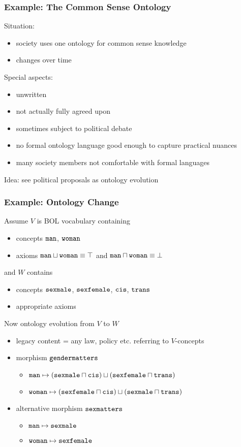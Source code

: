 \begin{frame}\frametitle{Example: The Common Sense Ontology}
Situation:
\begin{itemize}
\item society uses one ontology for common sense knowledge
\item changes over time
\end{itemize}

Special aspects:
\begin{itemize}
\item unwritten
\item not actually fully agreed upon
\item sometimes subject to political debate
\item no formal ontology language good enough to capture practical nuances
\item many society members not comfortable with formal languages
\end{itemize}


Idea: see political proposals as ontology evolution
\end{frame}

\begin{frame}[fragile]\frametitle{Example: Ontology Change}
Assume $V$ is BOL vocabulary containing
\begin{itemize}
\item concepts $\cn{man}$, $\cn{woman}$
\item axioms $\cn{man}\sqcup\cn{woman}\equiv \top$ and $\cn{man}\sqcap\cn{woman}\equiv \bot$
\end{itemize}

and $W$ contains
\begin{itemize}
\item concepts $\cn{sexmale}$, $\cn{sexfemale}$, $\cn{cis}$, $\cn{trans}$
\item appropriate axioms
\end{itemize}

Now ontology evolution from $V$ to $W$
\begin{itemize}
\item legacy content = any law, policy etc. referring to $V$-concepts
\item morphism $\cn{gendermatters}$
 \begin{itemize}
 \item $\cn{man}\mapsto (\cn{sexmale}\sqcap\cn{cis})\sqcup (\cn{sexfemale}\sqcap\cn{trans})$
 \item $\cn{woman}\mapsto (\cn{sexfemale}\sqcap\cn{cis})\sqcup (\cn{sexmale}\sqcap\cn{trans})$
 \end{itemize}
\item alternative morphism $\cn{sexmatters}$
 \begin{itemize}
 \item $\cn{man}\mapsto \cn{sexmale}$
 \item $\cn{woman}\mapsto \cn{sexfemale}$
 \end{itemize}
\end{itemize}
\end{frame}


